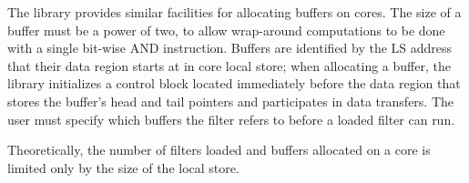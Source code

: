 The library provides similar facilities for allocating buffers on
cores. The size of a buffer must be a power of two, to allow
wrap-around computations to be done with a single bit-wise
\textsf{AND} instruction. Buffers are identified by the LS address
that their data region starts at in core local store; when allocating
a buffer, the library initializes a control block located immediately
before the data region that stores the buffer's head and tail pointers
and participates in data transfers. The user must specify which
buffers the filter refers to before a loaded filter can run.


Theoretically, the number of filters loaded and buffers allocated on a
core is limited only by the size of the local store.




